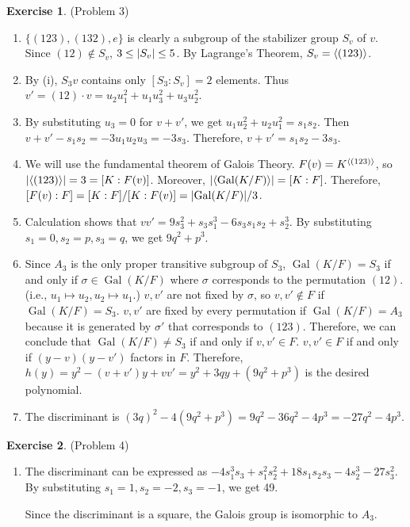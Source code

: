 \documentclass[12pt, psamsfonts]{amsart}
\theoremstyle{definition}
\newtheorem*{exer}{Exercise}
\theoremstyle{remark}
\DeclareMathOperator{\Gal}{Gal}
\numberwithin{equation}{section}
\begin{document}
\begin{exer}{(Problem 3)}
  \begin{enumerate}[label=(\roman*)]
    \item
      $\{ (123), (132), e \}$ is clearly a subgroup of the stabilizer group $S_v$ of $v$.
      Since $(12) \notin S_v$, $3 \leq \abs{S_v} \leq 5$.
      By Lagrange's Theorem, $S_v = \ev{(123)}$. 
    \item
      By (i), $S_3v$ contains only $[S_3:S_v] = 2$ elements.
      Thus $v' = (12) \cdot v = u_2u_1^2 + u_1u_3^2 + u_3u_2^2$.
    \item
      By substituting $u_3 = 0$ for $v + v'$, we get $u_1u_2^2 + u_2u_1^2 = s_1s_2$.
      Then $v + v' - s_1s_2 = -3u_1u_2u_3 = -3s_3$.
      Therefore, $v + v' = s_1s_2 - 3s_3$.
    \item
      We will use the fundamental theorem of Galois Theory.
      $F(v) = K^{\ev{(123)}}$, so $\abs{\ev{(123)}} = 3 = [K:F(v)]$.
      Moreover, $\abs{\ev{\Gal(K/F)}} = [K:F]$.
      Therefore, $[F(v):F] = [K:F]/[K:F(v)] = \abs{\Gal(K/F)}/3$.
    \item
      Calculation shows that $vv' = 9s_3^2 + s_3s_1^3 - 6s_3s_1s_2 + s_2^3$.
      By substituting $s_1 = 0, s_2 = p, s_3 = q$, we get $9q^2 + p^3$.
    \item
      Since $A_3$ is the only proper transitive subgroup of $S_3$, $\Gal(K/F) = S_3$ if and only if $\sigma \in \Gal(K/F)$ where $\sigma$ corresponds to the permutation $(12)$.
      (i.e., $u_1 \mapsto u_2, u_2 \mapsto u_1$.)
      $v, v'$ are not fixed by $\sigma$, so $v, v' \notin F$ if $\Gal(K/F) = S_3$.
      $v, v'$ are fixed by every permutation if $\Gal(K/F) = A_3$ because it is generated by $\sigma'$ that corresponds to $(123)$.
      Therefore, we can conclude that $\Gal(K/F) \ne S_3$ if and only if $v, v' \in F$.
      $v, v' \in F$ if and only if $(y - v)(y - v')$ factors in $F$.
      Therefore, $h(y) = y^2 - (v + v')y + vv' = y^2 + 3qy + (9q^2 + p^3)$ is the desired polynomial.
    \item
      The discriminant is $(3q)^2 - 4(9q^2 + p^3) = 9q^2 - 36q^2 - 4p^3 = -27q^2 - 4p^3$.
  \end{enumerate}
\end{exer}

\begin{exer}{(Problem 4)}
  \begin{enumerate}[label=(\roman*)]
    \item 
      The discriminant can be expressed as $-4s_{1}^{3}s_{3}+s_{1}^{2}s_{2}^{2}+18s_{1}s_{2}s_{3}-4s_{2}^{3}-27s_{3}^{2}$.
      By substituting $s_1 = 1, s_2 = -2, s_3 = -1$, we get 49.
      
      Since the discriminant is a square, the Galois group is isomorphic to $A_3$.

  \end{enumerate}
\end{exer}
\end{document}
